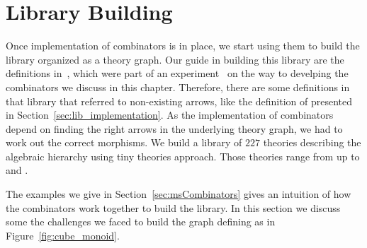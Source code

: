 \section{Library Building}
\label{sec:guidelines}
Once implementation of combinators is in place, we start using them to build the library organized as a theory graph. Our guide in building this library are the definitions in~, which were part of an experiment~\cite{mathscheme2011experiments} on the way to develping the combinators we discuss in this chapter. Therefore, there are some definitions in that library that referred to non-existing arrows, like the definition of  presented in Section~\ref{sec:lib_implementation}. As the implementation of combinators depend on finding the right arrows in the underlying theory graph, we had to work out the correct morphisms. We build a library of $227$ theories describing the algebraic hierarchy using tiny theories approach. Those theories range from  up to  and  .
 
The examples we give in Section~\ref{sec:msCombinators} gives an intuition of how the combinators work together to build the library. In this section we discuss some the challenges we faced to build the graph defining  as in Figure~\ref{fig:cube_monoid}.  

